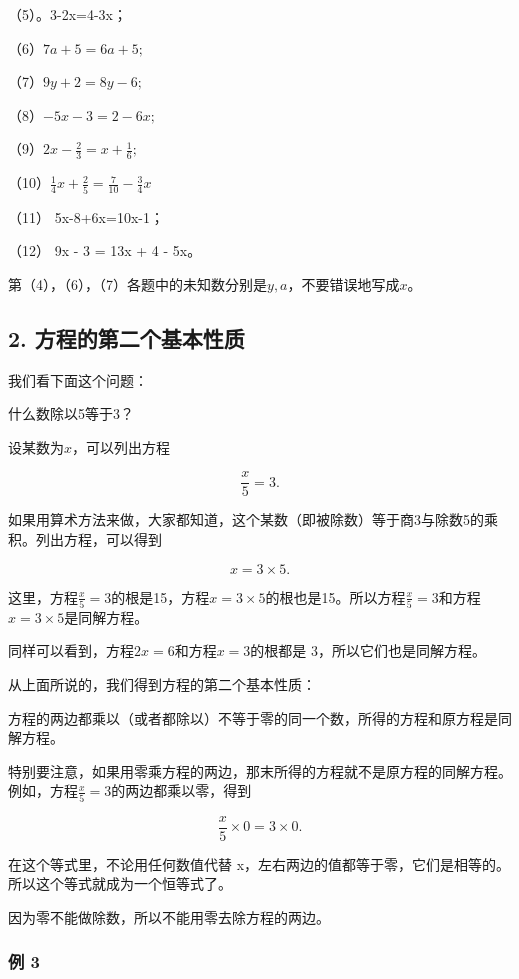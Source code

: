 （5）。3-2x=4-3x；

（6）\(7a + 5 = 6a + 5;\)

（7）\(9y + 2 = 8y - 6;\)

（8）\(-5x - 3 = 2 - 6x;\)

（9）\(2x - \frac{2}{3} = x + \frac{1}{6};\)

（10）\(\frac{1}{4}x + \frac{2}{5} = \frac{7}{10} - \frac{3}{4}x\)

（11） 5x-8+6x=10x-1；

（12） 9x - 3 = 13x + 4 - 5x。

第（4），（6），（7）各题中的未知数分别是\(y, a\)，不要错误地写成\(x\)。

\subsection{2. 方程的第二个基本性质}

我们看下面这个问题：

什么数除以5等于3？

设某数为\(x\)，可以列出方程

\[
\frac{x}{5} = 3.
\]

如果用算术方法来做，大家都知道，这个某数（即被除数）等于商3与除数5的乘积。列出方程，可以得到

\[
x = 3 \times 5.
\]

这里，方程\(\frac{x}{5} = 3\)的根是15，方程\(x = 3 \times 5\)的根也是15。所以方程\(\frac{x}{5} = 3\)和方程\(x = 3 \times 5\)是同解方程。

同样可以看到，方程\(2x = 6\)和方程\(x = 3\)的根都是
3，所以它们也是同解方程。

从上面所说的，我们得到方程的第二个基本性质：

方程的两边都乘以（或者都除以）不等于零的同一个数，所得的方程和原方程是同解方程。

特别要注意，如果用零乘方程的两边，那末所得的方程就不是原方程的同解方程。例如，方程\(\frac{x}{5} = 3\)的两边都乘以零，得到

\[
\frac{x}{5} \times 0 = 3 \times 0.
\]

在这个等式里，不论用任何数值代替
x，左右两边的值都等于零，它们是相等的。所以这个等式就成为一个恒等式了。

因为零不能做除数，所以不能用零去除方程的两边。

\subsubsection{例 3}

